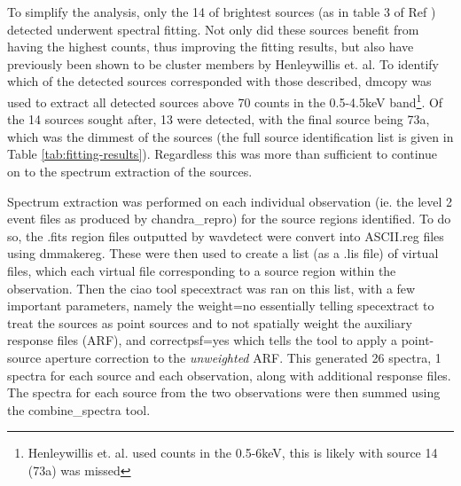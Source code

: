 \documentclass[aps,
                pra,  
                a4paper, 
                amsmath, 
                amssymb, 
                preprint,
                tightenlines,  
                amsfonts,
                nofootinbib,
                notitlepage
            ]{revtex4-2}
\begin{document}
To simplify the analysis, only the 14 of brightest sources (as in table 3 of Ref \cite{Henleywillis2018}) detected underwent spectral fitting. Not only did these sources benefit from having the highest counts, thus improving the fitting results, but also have previously been shown to be cluster members by Henleywillis et. al. To identify which of the detected sources corresponded with those described, {\sc dmcopy} was used to extract all detected sources above 70 counts in the 0.5-4.5keV band\footnote{Henleywillis et. al. used counts in the 0.5-6keV, this is likely with source 14 (73a) was missed}. Of the 14 sources sought after, 13 were detected, with the final source being 73a, which was the dimmest of the sources (the full source identification list is given in Table \ref{tab:fitting-results}). Regardless this was more than sufficient to continue on to the spectrum extraction of the sources. 
\par
Spectrum extraction was performed on each individual observation (ie. the level 2 event files as produced by {\sc chandra\_repro}) for the source regions identified. To do so, the {\sc .fits} region files outputted by {\sc wavdetect} were convert into ASCII{\sc .reg} files using {\sc dmmakereg}. These were then used to create a list (as a {\sc .lis} file) of virtual files, which each virtual file corresponding to a source region within the observation. Then the {\sc ciao} tool {\sc specextract} was ran on this list, with a few important parameters, namely the {\sc weight=no} essentially telling {\sc specextract} to treat the sources as point sources and to not spatially weight the auxiliary response files (ARF), and {\sc correctpsf=yes} which tells the tool to apply a point-source aperture correction to the {\it unweighted} ARF. This generated 26 spectra, 1 spectra for each source and each observation, along with additional response files. The spectra for each source from the two observations were then summed using the {\sc combine\_spectra} tool. 
\par
\end{document}
